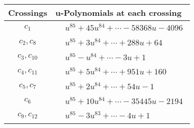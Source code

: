 \documentclass[1p]{elsarticle_modified}
\theoremstyle{definition}
\begin{document}
\begin{tabular}{m{50pt}|m{274pt}}
Crossings & \hspace{64pt}u-Polynomials at each crossing \\
\hline $$\begin{aligned}c_{1}\end{aligned}$$&$\begin{aligned}
&u^{85}+45 u^{84}+\cdots-58368 u-4096
\end{aligned}$\\
\hline $$\begin{aligned}c_{2},c_{8}\end{aligned}$$&$\begin{aligned}
&u^{85}+3 u^{84}+\cdots+288 u+64
\end{aligned}$\\
\hline $$\begin{aligned}c_{3},c_{10}\end{aligned}$$&$\begin{aligned}
&u^{85}- u^{84}+\cdots-3 u+1
\end{aligned}$\\
\hline $$\begin{aligned}c_{4},c_{11}\end{aligned}$$&$\begin{aligned}
&u^{85}+5 u^{84}+\cdots+951 u+160
\end{aligned}$\\
\hline $$\begin{aligned}c_{5},c_{7}\end{aligned}$$&$\begin{aligned}
&u^{85}+2 u^{84}+\cdots+54 u-1
\end{aligned}$\\
\hline $$\begin{aligned}c_{6}\end{aligned}$$&$\begin{aligned}
&u^{85}+10 u^{84}+\cdots-35445 u-2194
\end{aligned}$\\
\hline $$\begin{aligned}c_{9},c_{12}\end{aligned}$$&$\begin{aligned}
&u^{85}-3 u^{83}+\cdots-4 u+1
\end{aligned}$\\
\hline
\end{tabular}\\~\\
\newpage\renewcommand{\arraystretch}{1}
\end{document}
